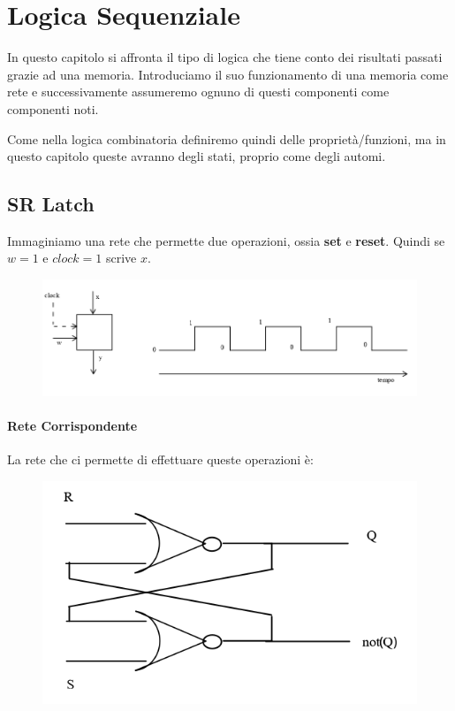 \documentclass{article}
\begin{document}
\newpage

\section{Logica Sequenziale}

In questo capitolo si affronta il tipo di logica che tiene conto dei risultati passati grazie ad una memoria. Introduciamo il suo funzionamento di una memoria come rete e successivamente assumeremo ognuno di questi componenti come componenti noti.

Come nella logica combinatoria definiremo quindi delle proprietà/funzioni, ma in questo capitolo queste avranno degli stati, proprio come degli automi.

\vspace*{20px}

\subsection{SR Latch}

Immaginiamo una rete che permette due operazioni, ossia \textbf{set} e \textbf{reset}. Quindi se $w=1$ e $clock=1$ scrive $x$.

\begin{figure}[htbp]
    \includegraphics[scale=0.55]{img/memorie1.png}
    \centering
\end{figure}

\vspace*{20px}

\paragraph{Rete Corrispondente}

La rete che ci permette di effettuare queste operazioni è:

\begin{figure}[htbp]
    \includegraphics[scale=0.45]{img/memorie2.png}
    \centering
\end{figure}
\end{document}
